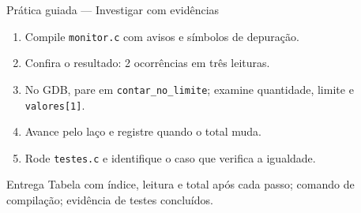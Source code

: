 \begin{frame}{Prática guiada — Investigar com evidências}
\begin{enumerate}
\item Compile \texttt{monitor.c} com avisos e símbolos de depuração.
\item Confira o resultado: 2 ocorrências em três leituras.
\item No GDB, pare em \texttt{contar\_no\_limite}; examine quantidade, limite e \texttt{valores[1]}.
\item Avance pelo laço e registre quando o total muda.
\item Rode \texttt{testes.c} e identifique o caso que verifica a igualdade.
\end{enumerate}
\begin{block}{Entrega}
Tabela com índice, leitura e total após cada passo; comando de compilação; evidência de testes concluídos.
\end{block}
\end{frame}
